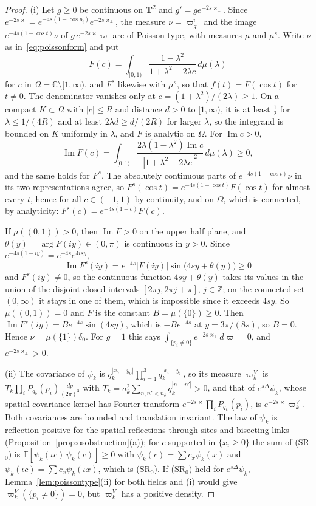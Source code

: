 \documentclass[aps,prd,twocolumn,superscriptaddress,nofootinbib,longbibliography,floatfix,amsmath,amssymb,10pt]{revtex4-2}
\theoremstyle{definition}
\theoremstyle{remark}
\newcommand{\Z}{\mathbb{Z}}
\newcommand{\C}{\mathbb{C}}
\newcommand{\E}{\mathbb{E}}
\begin{document}
\begin{proof}
(i) Let $g\ge0$ be continuous on $\mathbf T^2$ and $g'=ge^{-2s\varkappa_
\perp}$. Since $e^{-2s\varkappa}=e^{-4s(1-\cos p_i)}e^{-2s\varkappa_\perp}$,
the measure $\nu=\varpi^i_{g'}$ and the image $e^{-4s(1-\cos t)}\nu$ of
$g\,e^{-2s\varkappa}\varpi$ are of Poisson type, with measures $\mu$ and
$\mu^s$. Write $\nu$ as in~\eqref{eq:poissonform} and put
\[
F(c)=\int_{[0,1)}\frac{1-\lambda^2}{1+\lambda^2-2\lambda c}\,d\mu(\lambda)
\]
for $c$ in $\Omega=\C\setminus[1,\infty)$, and $F^s$ likewise with $\mu^s$,
so that $f(t)=F(\cos t)$ for $t\ne0$. The denominator vanishes only at
$c=(1+\lambda^2)/(2\lambda)\ge1$. On a compact $K\subset\Omega$ with
$|c|\le R$ and distance $d>0$ to $[1,\infty)$, it is at least $\frac12$ for
$\lambda\le1/(4R)$ and at least $2\lambda d\ge d/(2R)$ for larger
$\lambda$, so the integrand is bounded on $K$ uniformly in $\lambda$, and
$F$ is analytic on $\Omega$. For $\operatorname{Im}c>0$,
\[
\operatorname{Im}F(c)=\int_{[0,1)}\frac{2\lambda(1-\lambda^2)
\operatorname{Im}c}{|1+\lambda^2-2\lambda c|^2}\,d\mu(\lambda)\ge0 ,
\]
and the same holds for $F^s$. The absolutely continuous parts of
$e^{-4s(1-\cos t)}\nu$ in its two representations agree, so
$F^s(\cos t)=e^{-4s(1-\cos t)}F(\cos t)$ for almost every $t$, hence for
all $c\in(-1,1)$ by continuity, and on $\Omega$, which is connected, by
analyticity: $F^s(c)=e^{-4s(1-c)}F(c)$.

If $\mu((0,1))>0$, then $\operatorname{Im}F>0$ on the upper half plane,
and $\theta(y)=\arg F(iy)\in(0,\pi)$ is continuous in $y>0$. Since
$e^{-4s(1-iy)}=e^{-4s}e^{4isy}$,
\[
\operatorname{Im}F^s(iy)=e^{-4s}|F(iy)|\sin\bigl(4sy+\theta(y)\bigr)\ge0
\]
and $F^s(iy)\ne0$, so the continuous function
$4sy+\theta(y)$ takes its values in the union of the disjoint closed
intervals $[2\pi j,2\pi j+\pi]$, $j\in\Z$; on the connected set $(0,\infty)$
it stays in one of them, which is impossible since it exceeds $4sy$. So
$\mu((0,1))=0$ and $F$ is the constant $B=\mu(\{0\})\ge0$. Then
$\operatorname{Im}F^s(iy)=Be^{-4s}\sin(4sy)$, which is $-Be^{-4s}$ at
$y=3\pi/(8s)$, so $B=0$. Hence $\nu=\mu(\{1\})\delta_0$. For $g=1$ this
says $\int_{\{p_i\ne0\}}e^{-2s\varkappa_\perp}d\varpi=0$, and
$e^{-2s\varkappa_\perp}>0$.

(ii) The covariance of $\psi_k$ is $q_k^{|x_0-y_0|}\prod_{i=1}^3q_k^{|x_i-
y_i|}$, so its measure $\varpi^V_k$ is $T_k\prod_iP_{q_k}(p_i)\frac{dp}
{(2\pi)^3}$ with $T_k=a_k^2\sum_{n,n'<n_\delta}q_k^{|n-n'|}>0$, and that
of $e^{s\Delta}\psi_k$, whose spatial covariance kernel has Fourier
transform $e^{-2s\varkappa}\prod_iP_{q_k}(p_i)$, is $e^{-2s\varkappa}
\varpi^V_k$. Both covariances are bounded and translation invariant. The
law of $\psi_k$ is reflection positive for the spatial reflections through
sites and bisecting links (Proposition~\ref{prop:osobstruction}(a)); for
$c$ supported in $\{x_i\ge0\}$ the sum of (SR$_0$) is
$\E[\overline{\psi_k(\iota c)}\,\psi_k(c)]\ge0$ with $\psi_k(c)=\sum c_x
\psi_k(x)$ and $\psi_k(\iota c)=\sum c_x\psi_k(\iota x)$, which is (SR$_0$).
If (SR$_0$) held for $e^{s\Delta}\psi_k$, Lemma~\ref{lem:poissontype}(ii)
for both fields and (i) would give $\varpi^V_k(\{p_i\ne0\})=0$, but
$\varpi^V_k$ has a positive density.
\end{proof}
\end{document}
